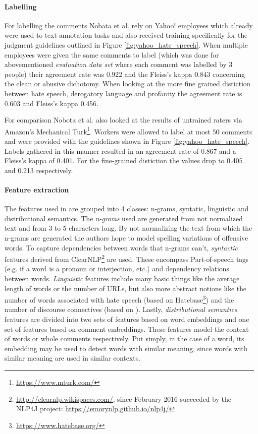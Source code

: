 \documentclass{proseminar}
\begin{document}
\paragraph{Labelling}
For labelling the comments Nobata et al. rely on Yahoo! employees which already were used to text annotation tasks and also received training specifically for the judgment guidelines outlined in Figure \ref{fig:yahoo_hate_speech}. When multiple employees were given the same comments to label (which was done for abovementioned \emph{evaluation data set} where each comment was labelled by 3 people) their agreement rate was 0.922 and the Fleiss's kappa 0.843 concerning the clean or abusive dichotomy. When looking at the more fine grained distiction between hate speech, derogatory language and profanity the agreement rate is 0.603 and Fleiss's kappa 0.456.

For comparison Nobota et al. also looked at the results of untrained raters via Amazon's Mechanical Turk\footnote{\url{https://www.mturk.com/}}. Workers were allowed to label at most 50 comments and were provided with the guidelines shown in Figure \ref{fig:yahoo_hate_speech}. Labels gathered in this manner resulted in an agreement rate of 0.867 and a Fleiss's kappa of 0.401. For the fine-grained distiction the values drop to 0.405 and 0.213 respectively.

\paragraph{Feature extraction} The features used in \cite{Yahoo:2016} are grouped into 4 classes: n-grams, syntatic, linguistic and distributional semantics. The \emph{n-grams} used are generated from not normalized text and from 3 to 5 characters long. By not normalizing the text from which the n-grams are generated the authors hope to model spelling variations of offensive words. To capture dependencies between words that n-grams can't, \emph{syntactic} features derived from ClearNLP\footnote{\url{http://clearnlp.wikispaces.com/}, since February 2016 succeeded by the NLP4J project: \url{https://emorynlp.github.io/nlp4j/}} are used. These encompass Part-of-speech tags (e.g. if a word is a pronoun or interjection, etc.) and dependency relations between words. \emph{Linguistic} features include many basic things like the average length of words or the number of URLs, but also more abstract notions like the number of words associated with hate speech (based on Hatebase\footnote{\url{https://www.hatebase.org/}}) and the number of discourse connectives (based on \cite{Pitler:2009}). Lastly, \emph{distributional semantics} features are divided into two sets of features based on word embeddings and one set of features based on comment embeddings. These features model the context of words or whole comments respectively. Put simply, in the case of a word, its embedding may be used to detect words with similar meaning, since words with similar meaning are used in similar contexts.
\end{document}
